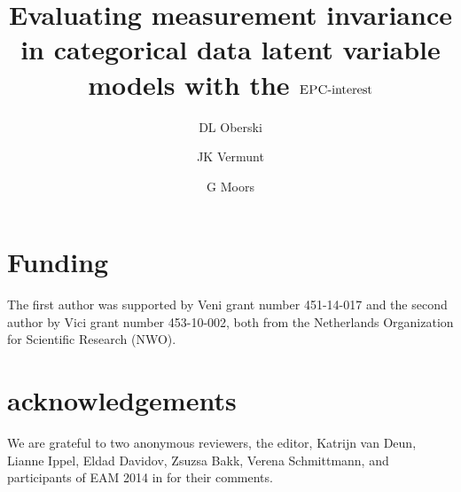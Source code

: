 \documentclass[letterpaper,12pt]{article}
\title{Evaluating measurement invariance in categorical data latent variable models with the  $\textrm{{\sc {EPC}}-interest}$}
\date{Department of Methodology and Statistics\\Tilburg University, The Netherlands\\
\raggedright\vspace{12pt}\footnotesize
Address: \\
Room P 1105, 
PO Box 90153, 5000 LE Tilburg\\
Phone:	+31 13 466 2959\\
Email: 	d.oberski@tilburguniversity.edu\\
}
\author{DL Oberski \and JK Vermunt \and G Moors}
\begin{document}
\maketitle
\thispagestyle{empty}


\vspace{-28pt}
\section*{Funding}

The first author was supported by Veni grant number 451-14-017 and the second author by  Vici grant number 453-10-002, both from the Netherlands Organization for Scientific Research (NWO).

\section*{acknowledgements}

We are grateful to two anonymous reviewers, the editor, Katrijn van Deun, Lianne Ippel, Eldad Davidov, Zsuzsa Bakk, Verena Schmittmann, and participants of EAM 2014 in for their comments.
\end{document}
